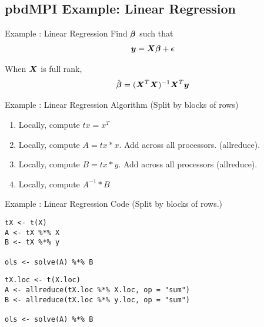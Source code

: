 \subsection{pbdMPI Example: Linear Regression}
\makesubcontentsslidessec


\begin{frame}
  \begin{block}{Example \countex :  Linear Regression}\pause
      Find $\boldsymbol{\beta}$ such that
      \begin{align*}
      \boldsymbol{y} = \boldsymbol{X}\boldsymbol{\beta} + \boldsymbol{\epsilon}
      \end{align*}

      When $\boldsymbol{X}$ is full rank,
      \begin{align*}
      \hat{\boldsymbol{\beta}} = (\boldsymbol{X}^T\boldsymbol{X})^{-1}\boldsymbol{X}^T\boldsymbol{y} \label{math:ols}
      \end{align*}
  \end{block}
\end{frame}


\begin{frame}
  \begin{block}{Example \showex :  Linear Regression Algorithm (Split
      by blocks of rows)}\pause 
    \begin{enumerate}
     \item Locally, compute $tx = x^T$
     \item Locally, compute $A = tx * x$. Add across all processors.
       (allreduce). 
     \item Locally, compute $B = tx * y$.  Add across all
       processors (allreduce). 
     \item Locally, compute $A^{-1} * B$ 
    \end{enumerate}
  \end{block}
\end{frame}


\begin{frame}[fragile]
  \begin{exampleblock}{Example \showex :  Linear Regression Code
      (Split by blocks of rows.)}\pause
\begin{lstlisting}[title=Serial Code]
tX <- t(X)
A <- tX %*% X
B <- tX %*% y

ols <- solve(A) %*% B
\end{lstlisting}
  
\begin{lstlisting}[title=Parallel Code]
tX.loc <- t(X.loc)
A <- allreduce(tX.loc %*% X.loc, op = "sum")
B <- allreduce(tX.loc %*% y.loc, op = "sum")

ols <- solve(A) %*% B
\end{lstlisting}
  \end{exampleblock}
\end{frame}